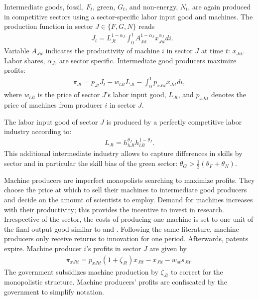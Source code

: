 Intermediate goods, fossil, $F_t$, green, $G_t$, and non-energy, $N_t$, are again produced in competitive sectors using a sector-specific labor input good and machines. The production function in sector $J\in \{F,G,N\}$ reads
\begin{align*}
&J_{t}= L_{Jt}^{1-\alpha_J}\int_{0}^{1}A_{Jit}^{1-\alpha_J}x_{Jit}^{\alpha_J} di.
\end{align*}
Variable $A_{Jit}$ indicates the productivity of machine $i$ in sector $J$ at time $t$: $x_{Jit}$. 
Labor shares, $\alpha_J$, are sector specific. 
Intermediate good producers maximize profits: 
\begin{align*}
\pi_{Jt}=p_{Jt}J_t-w_{lJt}L_{Jt}-\int_{0}^{1}p_{xJit}x_{Jit}di,
\end{align*}
where $w_{lJt}$ is the price of sector $J$'s labor input good, $L_{Jt}$, and $p_{xJit}$ denotes the price of machines from producer $i$ in sector $J$. 

The labor input good of sector $J$ is produced by a perfectly competitive labor industry according to:
\begin{align*}
L_{Jt}=h_{hJt}^{\theta_J}h_{lJt}^{1-\theta_J}.
\end{align*}
This additional intermediate industry allows to capture differences in skills by sector and in particular the skill bias of the green sector: $\theta_G>\frac{1}{2}(\theta_F+\theta_N)$. 

Machine producers are imperfect monopolists searching to maximize profits. They choose the price at which to sell their machines to intermediate good producers and decide on the amount of scientists to employ. Demand for machines increases with their productivity; this provides the incentive to invest in research. Irrespective of the sector, the costs of producing one machine is set to one unit of the final output good similar to \cite{Fried2018ClimateAnalysis} and \cite{Acemoglu2012TheChange}. 
Following the same literature, machine producers only receive returns to innovation for one period. Afterwards, patents expire. Machine producer $i$'s profits in sector $J$ are given by
\begin{align*}
\pi_{xJit}=p_{xJit}(1+\zeta_{Jt})x_{Jit}-x_{Jit}-w_{st}s_{Jit}.
\end{align*}
The government subsidizes machine production by $\zeta_{Jt}$ to correct for the monopolistic structure. Machine producers' profits are confiscated by the government to simplify notation.

